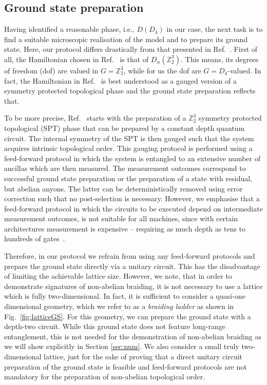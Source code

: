 \documentclass[a4paper,twocolumn,11pt]{quantumarticle}
\begin{document}
\subsection{Ground state preparation}
Having identified a reasonable phase, i.e., $D(D_4)$ in our case, the next task is to find a suitable microscopic realisation of the model and to prepare its ground state. Here, our protocol differs drastically from that presented in Ref.~\cite{iqbal2023creation}. First of all, the Hamiltonian chosen in Ref.~\cite{iqbal2023creation} is that of $D_\alpha(\mathbb Z_2^3)$. This means, its degrees of freedom (dof) are valued in $G=\mathbb Z_2^3$, while for us the dof are $G=D_4$-valued. In fact, the Hamiltonian in Ref.~\cite{iqbal2023creation} is best understood as a gauged version of a symmetry protected topological phase and the ground state preparation reflects that. 

To be more precise, Ref.~\cite{iqbal2023creation} starts with the preparation of a $\mathbb Z_2^3$ symmetry protected topological (SPT) phase that can be prepared by a constant depth quantum circuit. The internal symmetry of the SPT is then gauged such that the system acquires intrinsic topological order. This gauging protocol is performed using a feed-forward protocol in which the system is entangled to an extensive number of ancillas which are then measured. The measurement outcomes correspond to successful ground state preparation or the preparation of a state with residual, but abelian anyons. The latter can be deterministically removed using error correction such that no post-selection is necessary. However, we emphasise that a feed-forward protocol in which the circuits to be executed depend on intermediate measurement outcomes, is not suitable for all machines, since with certain architectures measurement is expensive -- requiring as much depth as tens to hundreds of gates~\cite{weber}.

Therefore, in our protocol we refrain from using any feed-forward protocols and prepare the ground state directly via a unitary circuit. This has the disadvantage of limiting the achievable lattice size. However, we note, that in order to demonstrate signatures of non-abelian braiding, it is not necessary to use a lattice which is fully two-dimensional. In fact, it is sufficient to consider a quasi-one dimensional geometry, which we refer to as a \emph{braiding ladder} as shown in Fig.~\ref{fig:latticeGS}. For this geometry, we can prepare the ground state with a depth-two circuit. While this ground state does not feature long-range entanglement, this is not needed for the demonstration of non-abelian braiding as we will show explicitly in Section \ref{sec:num}. We also consider a small truly two-dimensional lattice, just for the sake of proving that a direct unitary circuit preparation of the ground state is feasible and feed-forward protocols are not mandatory for the preparation of non-abelian topological order.
\end{document}
